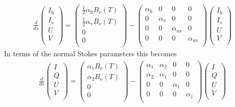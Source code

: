 \documentclass[letterpaper,10pt,english]{sphinxmanual}
\begin{document}
\label{\detokenize{dustradtrans:eq-formal-rt-emisabs-in-rotated-system}}\begin{equation*}
\begin{split}\frac{d}{ds}
\left(\begin{matrix}
I_{\mathrm{h}} \\
I_{\mathrm{v}} \\
U \\
V \\
\end{matrix}\right)
= \left(\begin{matrix}
\tfrac{1}{2}\alpha_{\mathrm{h}} B_\nu(T) \\
\tfrac{1}{2}\alpha_{\mathrm{v}} B_\nu(T) \\
0 \\
0 \\
\end{matrix}\right)
-
\left(\begin{matrix}
\alpha_{\mathrm{h}} & 0 & 0 & 0 \\
0 & \alpha_{\mathrm{v}} & 0 & 0  \\
0 & 0 & \alpha_{\mathrm{uv}} & 0 \\
0 & 0 & 0 & \alpha_{\mathrm{uv}} \\
\end{matrix}\right)
\left(\begin{matrix}
I_{\mathrm{h}} \\
I_{\mathrm{v}} \\
U \\
V \\
\end{matrix}\right)\end{split}
\end{equation*}
In terms of the normal Stokes parameters this becomes
\begin{equation*}
\begin{split}\frac{d}{ds}
\left(\begin{matrix}
I \\
Q \\
U \\
V \\
\end{matrix}\right)
= \left(\begin{matrix}
\alpha_1 B_\nu(T) \\
\alpha_2 B_\nu(T) \\
0 \\
0 \\
\end{matrix}\right)
-
\left(\begin{matrix}
\alpha_1 & \alpha_2 & 0 & 0 \\
\alpha_2 & \alpha_1 & 0 & 0  \\
0 & 0 & \alpha_1 & 0 \\
0 & 0 & 0 & \alpha_1 \\
\end{matrix}\right)
\left(\begin{matrix}
I \\
Q \\
U \\
V \\
\end{matrix}\right)\end{split}
\end{equation*}
\end{document}
